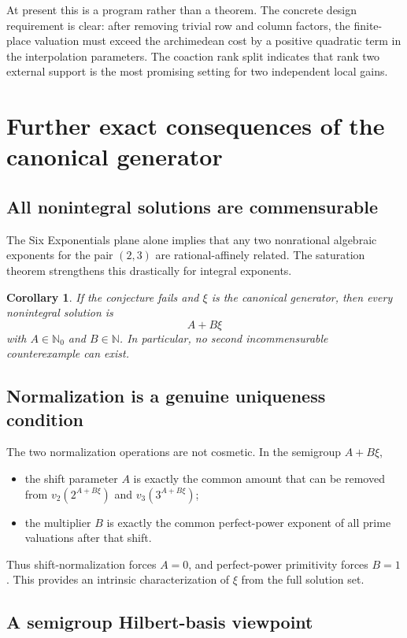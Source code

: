 \documentclass[11pt,oneside]{article}
\newtheorem{corollary}[theorem]{Corollary}
\theoremstyle{definition}
\newcommand{\N}{\mathbb N}
\begin{document}
At present this is a program rather than a theorem.  The concrete design requirement is clear: after removing trivial row and column factors, the finite-place valuation must exceed the archimedean cost by a positive quadratic term in the interpolation parameters.  The coaction rank split indicates that rank two external support is the most promising setting for two independent local gains.

\section{Further exact consequences of the canonical generator}

\subsection{All nonintegral solutions are commensurable}

The Six Exponentials plane alone implies that any two nonrational algebraic exponents for the pair $(2,3)$ are rational-affinely related.  The saturation theorem strengthens this drastically for integral exponents.

\begin{corollary}
If the conjecture fails and $\xi$ is the canonical generator, then every nonintegral solution is
\[
  A+B\xi
\]
with $A\in\N_0$ and $B\in\N$.  In particular, no second incommensurable counterexample can exist.
\end{corollary}

\subsection{Normalization is a genuine uniqueness condition}

The two normalization operations are not cosmetic.  In the semigroup $A+B\xi$,
\begin{itemize}
\item the shift parameter $A$ is exactly the common amount that can be removed from $v_2(2^{A+B\xi})$ and $v_3(3^{A+B\xi})$;
\item the multiplier $B$ is exactly the common perfect-power exponent of all prime valuations after that shift.
\end{itemize}
Thus shift-normalization forces $A=0$, and perfect-power primitivity forces $B=1$.  This provides an intrinsic characterization of $\xi$ from the full solution set.

\subsection{A semigroup Hilbert-basis viewpoint}
\end{document}
